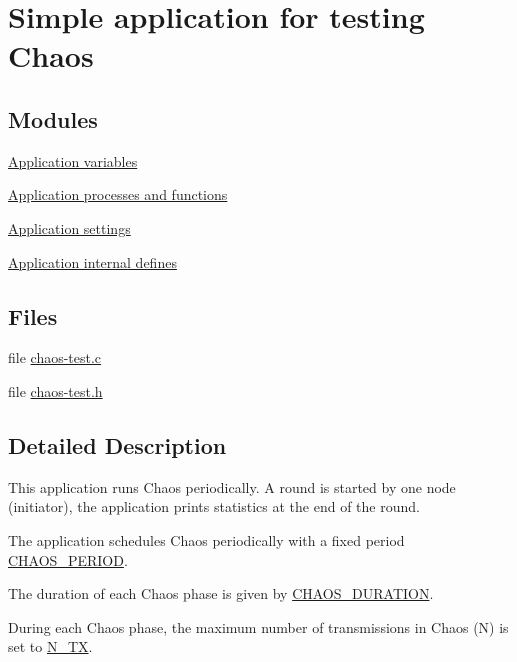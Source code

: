 \hypertarget{group__chaos-test}{\section{Simple application for testing Chaos}
\label{group__chaos-test}
}
\subsection*{Modules}
\begin{DoxyCompactItemize}
\item 
\hyperlink{group__chaos-test-variables}{Application variables}
\item 
\hyperlink{group__chaos-test-processes}{Application processes and functions}
\item 
\hyperlink{group__chaos-test-settings}{Application settings}
\item 
\hyperlink{group__chaos-test-defines}{Application internal defines}
\end{DoxyCompactItemize}
\subsection*{Files}
\begin{DoxyCompactItemize}
\item 
file \hyperlink{chaos-test_8c}{chaos-\/test.\-c}
\item 
file \hyperlink{chaos-test_8h}{chaos-\/test.\-h}
\end{DoxyCompactItemize}


\subsection{Detailed Description}
This application runs Chaos periodically. A round is started by one node (initiator), the application prints statistics at the end of the round.

The application schedules Chaos periodically with a fixed period \hyperlink{group__chaos-test-settings_ga9eb9256366e6e80d689339627c9b016a}{C\-H\-A\-O\-S\-\_\-\-P\-E\-R\-I\-O\-D}.

The duration of each Chaos phase is given by \hyperlink{group__chaos-test-settings_ga41b1c21c8fdb8d06878a6da529bd0da7}{C\-H\-A\-O\-S\-\_\-\-D\-U\-R\-A\-T\-I\-O\-N}.

During each Chaos phase, the maximum number of transmissions in Chaos (N) is set to \hyperlink{group__chaos-test-settings_ga50f8fba62aef680d9929caefea7ca7e4}{N\-\_\-\-T\-X}.


